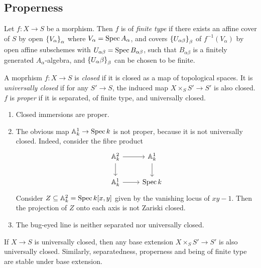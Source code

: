 \subsection{Properness}
\begin{definition}
    Let \( f : X \to S \) be a morphism.
    Then \( f \) is of \emph{finite type} if there exists an affine cover of \( S \) by open \( \qty{V_\alpha}_\alpha \) where \( V_\alpha = \operatorname{Spec} A_\alpha \), and covers \( \qty{U_{\alpha\beta}}_\beta \) of \( f^{-1}(V_\alpha) \) by open affine subschemes with \( U_{\alpha\beta} = \operatorname{Spec} B_{\alpha\beta} \), such that \( B_{\alpha\beta} \) is a finitely generated \( A_\alpha \)-algebra, and \( \qty{U_\alpha\beta}_{\beta} \) can be chosen to be finite.
\end{definition}
\begin{definition}
    A moprhism \( f : X \to S \) is \emph{closed} if it is closed as a map of topological spaces.
    It is \emph{universally closed} if for any \( S' \to S \), the induced map \( X \times_S S' \to S' \) is also closed.
    \( f \) is \emph{proper} if it is separated, of finite type, and universally closed.
\end{definition}
\begin{example}
    \begin{enumerate}
        \item Closed immersions are proper.
        \item The obvious map \( \mathbb A^1_k \to \operatorname{Spec} k \) is not proper, because it is not universally closed.
        Indeed, consider the fibre product
\[\begin{tikzcd}
	{\mathbb A^2_k} & {\mathbb A^1_k} \\
	{\mathbb A^1_k} & {\Spec k}
	\arrow[from=1-1, to=1-2]
	\arrow[from=1-2, to=2-2]
	\arrow[from=1-1, to=2-1]
	\arrow[from=2-1, to=2-2]
\end{tikzcd}\]
        Consider \( Z \subseteq \mathbb A^2_k = \operatorname{Spec} k[x,y] \) given by the vanishing locus of \( xy - 1 \).
        Then the projection of \( Z \) onto each axis is not Zariski closed.
        \item The bug-eyed line is neither separated nor universally closed.
    \end{enumerate}
\end{example}
\begin{remark}
	If \( X \to S \) is universally closed, then any base extension \( X \times_S S' \to S' \) is also universally closed.
    Similarly, separatedness, properness and being of finite type are stable under base extension.
\end{remark}
